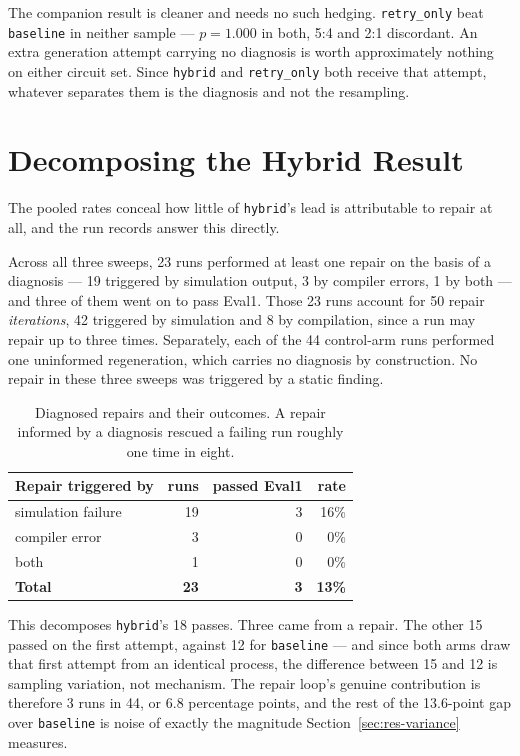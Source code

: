 \documentclass[11pt,a4paper,titlepage=false]{scrreprt}
\begin{document}
The companion result is cleaner and needs no such hedging. \texttt{retry\_only} beat
\texttt{baseline} in neither sample --- $p=1.000$ in both, 5:4 and 2:1 discordant. An extra
generation attempt carrying no diagnosis is worth approximately nothing on either circuit set.
Since \texttt{hybrid} and \texttt{retry\_only} both receive that attempt, whatever separates
them is the diagnosis and not the resampling.

\section{Decomposing the Hybrid Result}\label{sec:res-decompose}

The pooled rates conceal how little of \texttt{hybrid}'s lead is attributable to repair at
all, and the run records answer this directly.

Across all three sweeps, 23 runs performed at least one repair on the basis of a diagnosis
--- 19 triggered by simulation output, 3 by compiler errors, 1 by both --- and three of them
went on to pass Eval1. Those 23 runs account for 50 repair \emph{iterations}, 42 triggered by
simulation and 8 by compilation, since a run may repair up to three times. Separately, each
of the 44 control-arm runs performed one uninformed regeneration, which carries no diagnosis
by construction. No repair in these three sweeps was triggered by a static finding.

\begin{table}[H]
\centering
\small
\begin{tabular}{@{}l r r r@{}}
\toprule
\textbf{Repair triggered by} & \textbf{runs} & \textbf{passed Eval1} & \textbf{rate} \\
\midrule
simulation failure & 19 & 3 & 16\% \\
compiler error     & 3  & 0 & 0\%  \\
both               & 1  & 0 & 0\%  \\
\midrule
\textbf{Total}     & \textbf{23} & \textbf{3} & \textbf{13\%} \\
\bottomrule
\end{tabular}
\caption{Diagnosed repairs and their outcomes. A repair informed by a diagnosis rescued a
failing run roughly one time in eight.}
\label{tab:repair-success}
\end{table}

This decomposes \texttt{hybrid}'s 18 passes. Three came from a repair. The other 15 passed on
the first attempt, against 12 for \texttt{baseline} --- and since both arms draw that first
attempt from an identical process, the difference between 15 and 12 is sampling variation, not
mechanism. The repair loop's genuine contribution is therefore 3 runs in 44, or 6.8
percentage points, and the rest of the 13.6-point gap over \texttt{baseline} is noise of
exactly the magnitude Section~\ref{sec:res-variance} measures.
\end{document}
